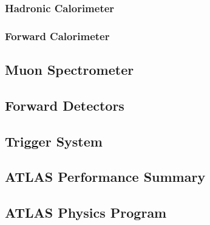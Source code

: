\subsubsection*{Hadronic Calorimeter}


\subsubsection*{Forward Calorimeter}


\subsection{Muon Spectrometer}


\subsection{Forward Detectors}

\subsection{Trigger System}
\label{sec:cern:trigger}

\subsection{ATLAS Performance Summary}


\subsection{ATLAS Physics Program}